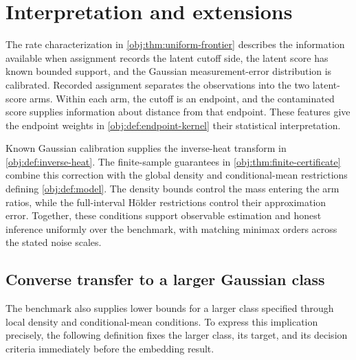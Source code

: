 \documentclass[11pt]{article}
\begin{document}
\section{Interpretation and extensions}

The rate characterization in \cref{obj:thm:uniform-frontier} describes the information available when assignment records the latent cutoff side, the latent score has known bounded support, and the Gaussian measurement-error distribution is calibrated. Recorded assignment separates the observations into the two latent-score arms. Within each arm, the cutoff is an endpoint, and the contaminated score supplies information about distance from that endpoint. These features give the endpoint weights in \cref{obj:def:endpoint-kernel} their statistical interpretation.

Known Gaussian calibration supplies the inverse-heat transform in \cref{obj:def:inverse-heat}. The finite-sample guarantees in \cref{obj:thm:finite-certificate} combine this correction with the global density and conditional-mean restrictions defining \cref{obj:def:model}. The density bounds control the mass entering the arm ratios, while the full-interval Hölder restrictions control their approximation error. Together, these conditions support observable estimation and honest inference uniformly over the benchmark, with matching minimax orders across the stated noise scales.

\subsection{Converse transfer to a larger Gaussian class}

The benchmark also supplies lower bounds for a larger class specified through local density and conditional-mean conditions. To express this implication precisely, the following definition fixes the larger class, its target, and its decision criteria immediately before the embedding result.
\end{document}
